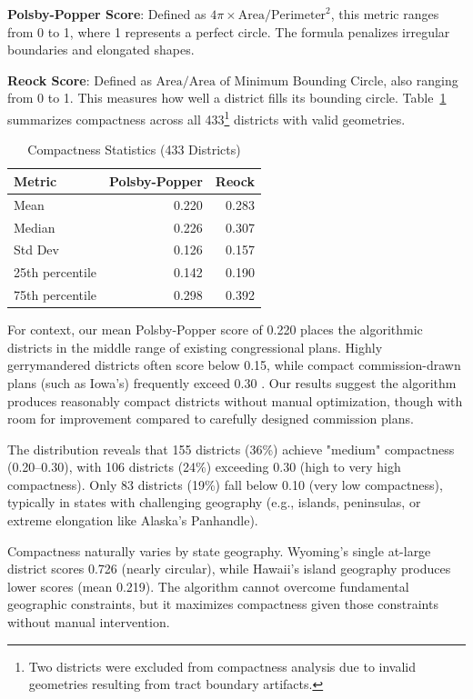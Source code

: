 \textbf{Polsby-Popper Score}: Defined as $4\pi \times \text{Area} / \text{Perimeter}^2$, this metric ranges from 0 to 1, where 1 represents a perfect circle. The formula penalizes irregular boundaries and elongated shapes.

\textbf{Reock Score}: Defined as $\text{Area} / \text{Area of Minimum Bounding Circle}$, also ranging from 0 to 1. This measures how well a district fills its bounding circle.
Table~\ref{tab:compactness_stats} summarizes compactness across all 433\footnote{Two districts were excluded from compactness analysis due to invalid geometries resulting from tract boundary artifacts.} districts with valid geometries.

\begin{table}[h]
\centering
\caption{Compactness Statistics (433 Districts)}
\label{tab:compactness_stats}
\begin{tabular}{lrr}
\toprule
\textbf{Metric} & \textbf{Polsby-Popper} & \textbf{Reock} \\
\midrule
Mean & 0.220 & 0.283 \\
Median & 0.226 & 0.307 \\
Std Dev & 0.126 & 0.157 \\
25th percentile & 0.142 & 0.190 \\
75th percentile & 0.298 & 0.392 \\
\bottomrule
\end{tabular}
\end{table}

For context, our mean Polsby-Popper score of 0.220 places the algorithmic districts in the middle range of existing congressional plans. Highly gerrymandered districts often score below 0.15, while compact commission-drawn plans (such as Iowa's) frequently exceed 0.30 \cite{deford2019implementing}. Our results suggest the algorithm produces reasonably compact districts without manual optimization, though with room for improvement compared to carefully designed commission plans.

The distribution reveals that 155 districts (36\%) achieve "medium" compactness (0.20--0.30), with 106 districts (24\%) exceeding 0.30 (high to very high compactness). Only 83 districts (19\%) fall below 0.10 (very low compactness), typically in states with challenging geography (e.g., islands, peninsulas, or extreme elongation like Alaska's Panhandle).

Compactness naturally varies by state geography. Wyoming's single at-large district scores 0.726 (nearly circular), while Hawaii's island geography produces lower scores (mean 0.219). The algorithm cannot overcome fundamental geographic constraints, but it maximizes compactness given those constraints without manual intervention.

